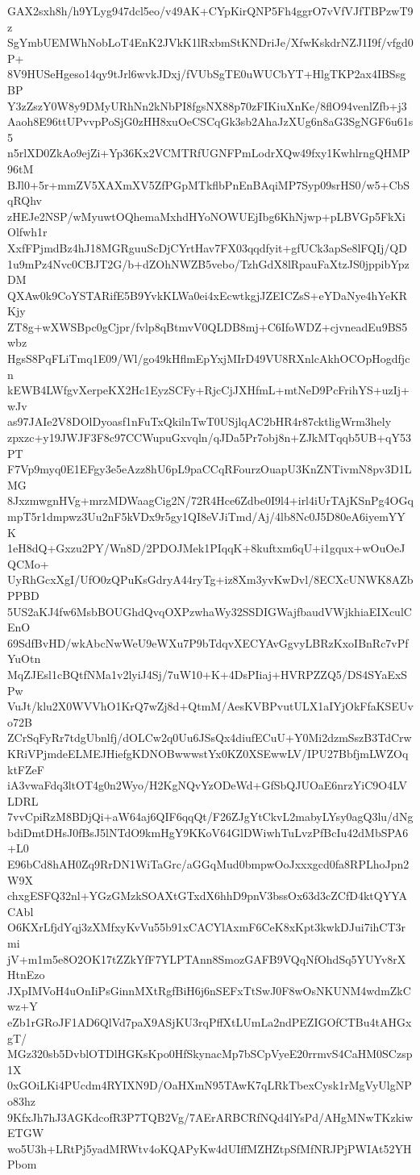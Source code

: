 GAX2sxh8h/h9YLyg947dcl5eo/v49AK+CYpKirQNP5Fh4ggrO7vVfVJfTBPzwT9z
SgYmbUEMWhNobLoT4EnK2JVkK1lRxbmStKNDriJe/XfwKskdrNZJ1I9f/vfgd0P+
8V9HUSeHgeso14qy9tJrl6wvkJDxj/fVUbSgTE0uWUCbYT+HlgTKP2ax4IBSsgBP
Y3zZszY0W8y9DMyURhNn2kNbPI8fgsNX88p70zFIKiuXnKe/8flO94venlZfb+j3
Aaoh8E96ttUPvvpPoSjG0zHH8xuOeCSCqGk3sb2AhaJzXUg6n8aG3SgNGF6u61s5
n5rlXD0ZkAo9ejZi+Yp36Kx2VCMTRfUGNFPmLodrXQw49fxy1KwhlrngQHMP96tM
BJl0+5r+mmZV5XAXmXV5ZfPGpMTkflbPnEnBAqiMP7Syp09srHS0/w5+CbSqRQhv
zHEJe2NSP/wMyuwtOQhemaMxhdHYoNOWUEjIbg6KhNjwp+pLBVGp5FkXiOlfwh1r
XxfFPjmdBz4hJ18MGRguuScDjCYrtHav7FX03qqdfyit+gfUCk3apSe8lFQIj/QD
1u9mPz4Nvc0CBJT2G/b+dZOhNWZB5vebo/TzhGdX8lRpauFaXtzJS0jppibYpzDM
QXAw0k9CoYSTARifE5B9YvkKLWa0ei4xEcwtkgjJZEICZsS+eYDaNye4hYeKRKjy
ZT8g+wXWSBpc0gCjpr/fvlp8qBtmvV0QLDB8mj+C6IfoWDZ+cjvneadEu9BS5wbz
HgsS8PqFLiTmq1E09/Wl/go49kHflmEpYxjMIrD49VU8RXnlcAkhOCOpHogdfjcn
kEWB4LWfgvXerpeKX2Hc1EyzSCFy+RjcCjJXHfmL+mtNeD9PcFrihYS+uzIj+wJv
as97JAIe2V8DOlDyoasf1nFuTxQkilnTwT0USjlqAC2bHR4r87cktligWrm3hely
zpxzc+y19JWJF3F8c97CCWupuGxvqln/qJDa5Pr7obj8n+ZJkMTqqb5UB+qY53PT
F7Vp9myq0E1EFgy3e5eAzz8hU6pL9paCCqRFourzOuapU3KnZNTivmN8pv3D1LMG
8JxzmwgnHVg+mrzMDWaagCig2N/72R4Hce6Zdbe0I9l4+irl4iUrTAjKSnPg4OGq
mpT5r1dmpwz3Uu2nF5kVDx9r5gy1QI8eVJiTmd/Aj/4lb8Nc0J5D80eA6iyemYYK
1eH8dQ+Gxzu2PY/Wn8D/2PDOJMek1PIqqK+8kuftxm6qU+i1gqux+wOuOeJQCMo+
UyRhGcxXgI/UfO0zQPuKsGdryA44ryTg+iz8Xm3yvKwDvl/8ECXcUNWK8AZbPPBD
5US2aKJ4fw6MsbBOUGhdQvqOXPzwhaWy32SSDIGWajfbaudVWjkhiaEIXculCEnO
69SdfBvHD/wkAbcNwWeU9eWXu7P9bTdqvXECYAvGgvyLBRzKxoIBnRc7vPfYuOtn
MqZJEsl1cBQtfNMa1v2lyiJ4Sj/7uW10+K+4DsPIiaj+HVRPZZQ5/DS4SYaExSPw
VuJt/klu2X0WVVhO1KrQ7wZj8d+QtmM/AesKVBPvutULX1aIYjOkFfaKSEUvo72B
ZCrSqFyRr7tdgUbnlfj/dOLCw2q0Uu6JSsQx4diufECuU+Y0Mi2dzmSszB3TdCrw
KRiVPjmdeELMEJHiefgKDNOBwwwstYx0KZ0XSEwwLV/IPU27BbfjmLWZOqktFZeF
iA3vwaFdq3ltOT4g0n2Wyo/H2KgNQvYzODeWd+GfSbQJUOaE6nrzYiC9O4LVLDRL
7vvCpiRzM8BDjQi+aW64aj6QIF6qqQt/F26ZJgYtCkvL2mabyLYsy0agQ3lu/dNg
bdiDmtDHsJ0fBsJ5lNTdO9kmHgY9KKoV64GlDWiwhTuLvzPfBcIu42dMbSPA6+L0
E96bCd8hAH0Zq9RrDN1WiTaGrc/aGGqMud0bmpwOoJxxxgcd0fa8RPLhoJpn2W9X
chxgESFQ32nl+YGzGMzkSOAXtGTxdX6hhD9pnV3bssOx63d3cZCfD4ktQYYACAbl
O6KXrLfjdYqj3zXMfxyKvVu55b91xCACYlAxmF6CeK8xKpt3kwkDJui7ihCT3rmi
jV+m1m5e8O2OK17tZZkYfF7YLPTAnn8SmozGAFB9VQqNfOhdSq5YUYv8rXHtnEzo
JXpIMVoH4uOnIiPsGinnMXtRgfBiH6j6nSEFxTtSwJ0F8wOsNKUNM4wdmZkCwz+Y
eZb1rGRoJF1AD6QlVd7paX9ASjKU3rqPffXtLUmLa2ndPEZIGOfCTBu4tAHGxgT/
MGz320sb5DvblOTDlHGKsKpo0HfSkynacMp7bSCpVyeE20rrmvS4CaHM0SCzsp1X
0xGOiLKi4PUcdm4RYIXN9D/OaHXmN95TAwK7qLRkTbexCysk1rMgVyUlgNPo83hz
9KfxJh7hJ3AGKdcofR3P7TQB2Vg/7AErARBCRfNQd4lYsPd/AHgMNwTKzkiwETGW
wo5U3h+LRtPj5yadMRWtv4oKQAPyKw4dUIffMZHZtpSfMfNRJPjPWIAt52YHPbom
